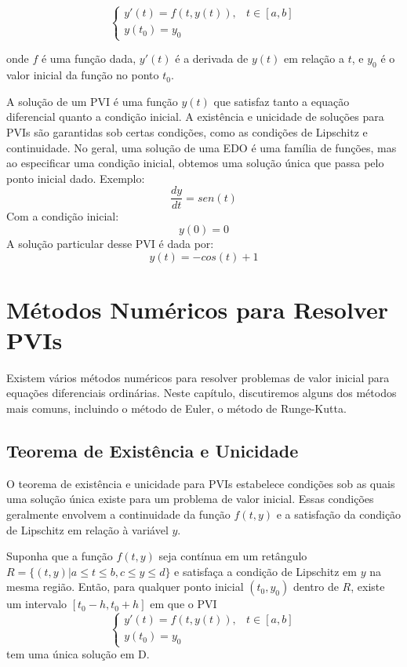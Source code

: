 \begin{equation}
    \begin{cases}
        y'(t) = f(t, y(t)), & t \in [a, b] \\
        y(t_0) = y_0
    \end{cases}
\end{equation}

onde $f$ é uma função dada, $y'(t)$ é a derivada de $y(t)$ em relação a $t$, e $y_0$ é o valor inicial da função no ponto $t_0$.

A solução de um PVI é uma função $y(t)$ que satisfaz tanto a equação diferencial quanto a condição inicial. A existência e unicidade de soluções para PVIs são garantidas sob certas condições, como as condições de Lipschitz e continuidade. No geral, uma solução de uma EDO é uma família de funções, mas ao especificar uma condição inicial, obtemos uma solução única que passa pelo ponto inicial dado.
Exemplo:
\begin{equation}
    \frac{dy}{dt} = sen(t)
\end{equation}
Com a condição inicial:
\begin{equation}
    y(0) = 0
\end{equation}
A solução particular desse PVI é dada por:
\begin{equation}
    y(t) = -cos(t) + 1
\end{equation}

\section{Métodos Numéricos para Resolver PVIs}

Existem vários métodos numéricos para resolver problemas de valor inicial para equações diferenciais ordinárias. Neste capítulo, discutiremos alguns dos métodos mais comuns, incluindo o método de Euler, o método de Runge-Kutta.

\subsection{Teorema de Existência e Unicidade}
O teorema de existência e unicidade para PVIs estabelece condições sob as quais uma solução única existe para um problema de valor inicial. Essas condições geralmente envolvem a continuidade da função $f(t, y)$ e a satisfação da condição de Lipschitz em relação à variável $y$.

\begin{teo}[PVI]
    Suponha que a função $f(t, y)$ seja contínua em um retângulo $R = \{(t, y) | a \leq t \leq b, c \leq y \leq d\}$ e satisfaça a condição de Lipschitz em $y$ na mesma região. Então, para qualquer ponto inicial $(t_0, y_0)$ dentro de $R$, existe um intervalo $\left[t_0 - h, t_0 + h\right]$ em que o PVI 
    \begin{equation}
        \begin{cases}
            y'(t) = f(t, y(t)), & t \in [a, b] \\
            y(t_0) = y_0
        \end{cases}
    \end{equation}
    tem uma única solução em D.
\end{teo}

